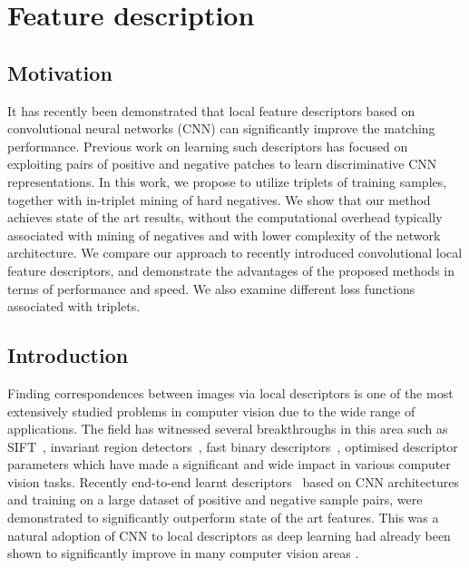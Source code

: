 \section{Feature description}

\subsection{Motivation}
It has recently been demonstrated that local feature descriptors
based on convolutional neural networks (CNN) can significantly
improve the matching performance.  Previous work on learning such
descriptors has focused on exploiting pairs of positive and negative
patches to learn discriminative CNN representations. In this work,
we propose to utilize triplets of training samples, together with
in-triplet mining of hard negatives. We show that our method
achieves state of the art results, without the computational
overhead typically associated with mining of negatives and with
lower complexity of the network architecture.  We compare our
approach to recently introduced convolutional local feature
descriptors, and demonstrate the advantages of the proposed methods
in terms of performance and speed.  We also examine different loss
functions associated with triplets.

\subsection{Introduction}

Finding correspondences between images via local descriptors is one of
the most extensively studied problems in computer vision due to the
wide range of applications. The field has witnessed several
breakthroughs in this area such as
SIFT~\cite{Lowe:2004:DIF:993451.996342}, invariant region
detectors~\cite{mikolajczykIJCV2004}, fast binary
descriptors~\cite{Calonder:2010:BBR:1888089.1888148}, optimised
descriptor parameters \cite{WHB09,simonyan2014learning} which have
made a significant and wide impact in various computer vision tasks.
Recently end-to-end learnt
descriptors~\cite{FDB14,simo2015deepdesc,ZagoruykoCVPR2015,Han_2015_CVPR}
based on CNN architectures and training on a large dataset of positive
and negative sample pairs, were demonstrated to significantly
outperform state of the art features. This was a natural adoption of
CNN to local descriptors as deep learning had already been shown to
significantly improve in many computer vision areas
\cite{lecun2015deep}.

